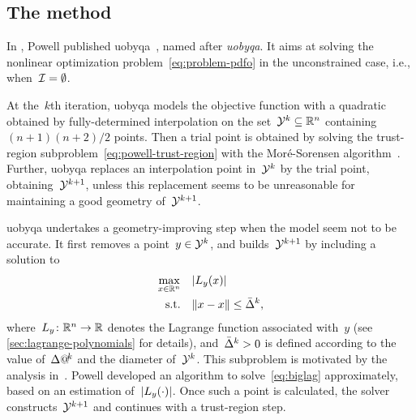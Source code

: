 \subsection{The  method}
\label{subsec:uobyqa}

In , Powell published \gls{uobyqa}~\cite{Powell_2002}, named after \emph{\glsdesc{uobyqa}}.
It aims at solving the nonlinear optimization problem~\cref{eq:problem-pdfo} in the unconstrained case, i.e., when~$\mathcal{I} = \emptyset$.

At the~$k$th iteration, \gls{uobyqa} models the objective function with a quadratic obtained by fully-determined interpolation on the set~$\xpt[k] \subseteq \R^n$ containing~$(n + 1)(n + 2) / 2$ points.
Then a trial point is obtained by solving the trust-region subproblem~\cref{eq:powell-trust-region} with the Mor{\'{e}}-Sorensen algorithm~\cite{More_Sorensen_1983}.
Further, \gls{uobyqa} replaces an interpolation point in~$\xpt[k]$ by the trial point, obtaining~$\xpt[k + 1]$, unless this replacement seems to be unreasonable for maintaining a good geometry of~$\xpt[k + 1]$.

\Gls{uobyqa} undertakes a geometry-improving step when the model seem not to be accurate.
It first removes a point~$y \in \xpt[k]$, and builds~$\xpt[k + 1]$ by including a solution to
\begin{subequations}
    \label{eq:biglag}
    \begin{align}
        \max_{x \in \R^n}   & \quad \abs{\lagp[y](x)}\\
        \text{s.t.}         & \quad \norm{x - \iter} \le \bar{\rad}^k, \label{eq:biglag-tr}
    \end{align}
\end{subequations}
where~$\lagp[y] \colon \R^n \to \R$ denotes the Lagrange function associated with~$y$ (see \cref{sec:lagrange-polynomials} for details), and~$\bar{\rad}^k > 0$ is defined according to the value of~$\rad[k]$ and the diameter of~$\xpt[k]$.
This subproblem is motivated by the analysis in~\cite[\S~2]{Powell_2001}.
Powell developed an algorithm to solve~\cref{eq:biglag} approximately, based on an estimation of~$\abs{\lagp[y](\cdot)}$.
Once such a point is calculated, the solver constructs~$\xpt[k + 1]$ and continues with a trust-region step.

